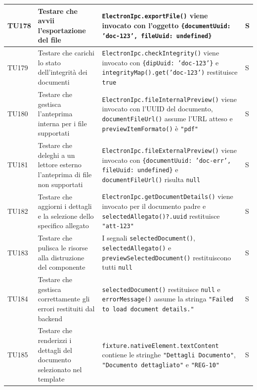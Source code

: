 \documentclass[a4paper,12pt]{article}
\begin{document}
\begin{longtable}{|M{1.2cm}|M{5cm}|M{8cm}|M{1.5cm}|}
            TU178 & Testare che \texttt{} avvii l'esportazione del file & \texttt{ElectronIpc.exportFile()} viene invocato con l'oggetto \texttt{\{documentUuid: 'doc-123', fileUuid: undefined\}} & S \\ 
            \hline
            
            TU179 & Testare che \texttt{} carichi lo stato dell'integrità dei documenti & \texttt{ElectronIpc.checkIntegrity()} viene invocato con \texttt{\{dipUuid: 'doc-123'\}} e \texttt{integrityMap().get('doc-123')} restituisce \texttt{true} & S \\ 
            \hline
            
            TU180 & Testare che \texttt{} gestisca l'anteprima interna per i file supportati & \texttt{ElectronIpc.fileInternalPreview()} viene invocato con l'UUID del documento, \texttt{documentFileUrl()} assume l'URL atteso e \texttt{previewItemFormato()} è \texttt{"pdf"} & S \\ 
            \hline
            
            TU181 & Testare che \texttt{} deleghi a un lettore esterno l'anteprima di file non supportati & \texttt{ElectronIpc.fileExternalPreview()} viene invocato con \texttt{\{documentUuid: 'doc-err', fileUuid: undefined\}} e \texttt{documentFileUrl()} risulta \texttt{null} & S \\ 
            \hline
            
            TU182 & Testare che \texttt{} aggiorni i dettagli e la selezione dello specifico allegato & \texttt{ElectronIpc.getDocumentDetails()} viene invocato per il documento padre e \texttt{selectedAllegato()?.uuid} restituisce \texttt{"att-123"} & S \\ 
            \hline
            
            TU183 & Testare che \texttt{} pulisca le risorse alla distruzione del componente & I segnali \texttt{selectedDocument()}, \texttt{selectedAllegato()} e \texttt{previewSelectedDocument()} restituiscono tutti \texttt{null} & S \\ 
            \hline
            
            TU184 & Testare che \texttt{} gestisca correttamente gli errori restituiti dal backend & \texttt{selectedDocument()} restituisce \texttt{null} e \texttt{errorMessage()} assume la stringa \texttt{"Failed to load document details."} & S \\ 
            \hline
            
            TU185 & Testare che \texttt{} renderizzi i dettagli del documento selezionato nel template & \texttt{fixture.nativeElement.textContent} contiene le stringhe \texttt{"Dettagli Documento"}, \texttt{"Documento dettagliato"} e \texttt{"REG-10"} & S \\ 
            \hline

        \end{longtable}
\end{document}
